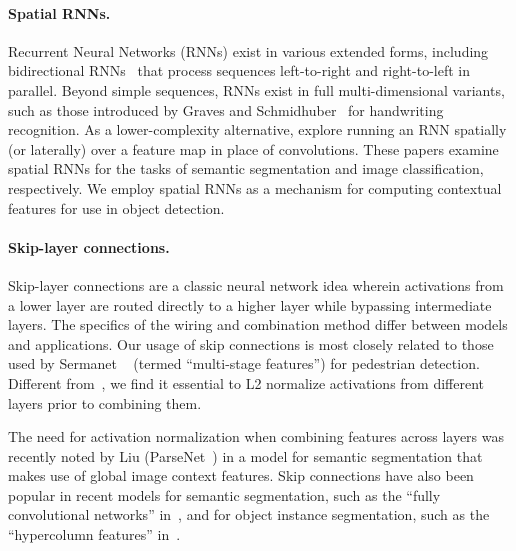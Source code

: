 \documentclass[10pt,twocolumn,letterpaper]{article}
\begin{document}
\vspace{-3pt}\paragraph{Spatial RNNs.}
Recurrent Neural Networks (RNNs) exist in various extended forms, including
bidirectional RNNs~\cite{bi-rnn} that process sequences left-to-right and
right-to-left in parallel.  Beyond simple sequences, RNNs exist in full
multi-dimensional variants, such as those introduced by Graves and
Schmidhuber~\cite{nd-rnn} for handwriting recognition.  As a lower-complexity
alternative, \cite{sceneLSTM,renet} explore running an RNN spatially (or
laterally) over a feature map in place of convolutions. These papers examine
spatial RNNs for the tasks of semantic segmentation and image classification,
respectively.  We employ spatial RNNs as a mechanism for computing contextual
features for use in object detection.

\vspace{-3pt}\paragraph{Skip-layer connections.}
Skip-layer connections are a classic neural network idea wherein activations
from a lower layer are routed directly to a higher layer while bypassing intermediate layers.  The specifics of the wiring and combination method
differ between models and applications.  Our usage of skip connections is most
closely related to those used by Sermanet \etal~\cite{sermanetCVPR13} (termed
``multi-stage features'') for pedestrian detection.  Different
from~\cite{sermanetCVPR13}, we find it essential to L2 normalize activations
from different layers prior to combining them.

The need for activation normalization when combining features across layers was
recently noted by Liu \etal(ParseNet~\cite{parsenet}) in a model for semantic segmentation
that makes use of global image context features.  Skip connections have also
been popular in recent models for semantic segmentation, such as the ``fully
convolutional networks'' in~\cite{fcn}, and for object instance segmentation,
such as the ``hypercolumn features'' in~\cite{hariharan2015hypercolumns}.
\end{document}
